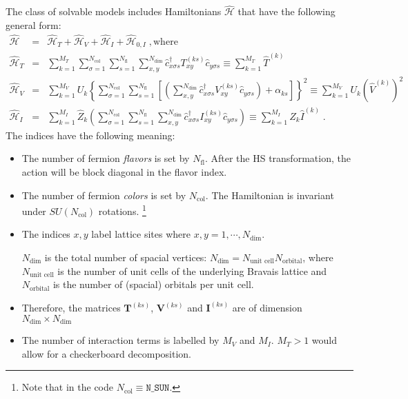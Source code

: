The class of solvable models includes  Hamiltonians $\hat{\mathcal{H}}$ that have the following general form:
\begin{eqnarray}
\hat{\mathcal{H}}&=&\hat{\mathcal{H}}_{T}+\hat{\mathcal{H}}_{V} +  \hat{\mathcal{H}}_{I} +   \hat{\mathcal{H}}_{0,I}\;,\mathrm{where}
\label{eqn:general_ham}\\
\hat{\mathcal{H}}_{T}
&=&
\sum\limits_{k=1}^{M_T}
\sum\limits_{\sigma=1}^{N_{\mathrm{col}}}
\sum\limits_{s=1}^{N_{\mathrm{fl}}}
\sum\limits_{x,y}^{N_{\mathrm{dim}}}
\hat{c}^{\dagger}_{x \sigma   s}T_{xy}^{(k s)} \hat{c}^{\phantom\dagger}_{y \sigma s}  \equiv  \sum\limits_{k=1}^{M_T} \hat{T}^{(k)}
\label{eqn:general_ham_t}\\
\hat{\mathcal{H}}_{V}
&=&
\sum\limits_{k=1}^{M_V}U_{k}
\left\{
\sum\limits_{\sigma=1}^{N_{\mathrm{col}}}
\sum\limits_{s=1}^{N_{\mathrm{fl}}}
\left[
\left(
\sum\limits_{x,y}^{N_{\mathrm{dim}}}
\hat{c}^{\dagger}_{x \sigma s}V_{xy}^{(k s)}\hat{c}^{\phantom\dagger}_{y \sigma s}
\right)
+\alpha_{k s} 
\right]
\right\}^{2}  \equiv   
\sum\limits_{k=1}^{M_V}U_{k}   \left(\hat{V}^{(k)} \right)^2
\label{eqn:general_ham_v}\\
\hat{\mathcal{H}}_{I}  & = &
\sum\limits_{k=1}^{M_I} \hat{Z}_{k} 
\left(
\sum\limits_{\sigma=1}^{N_{\mathrm{col}}}
\sum\limits_{s=1}^{N_{\mathrm{fl}}}
\sum\limits_{x,y}^{N_{\mathrm{dim}}}
\hat{c}^{\dagger}_{x \sigma s} I_{xy}^{(k s)}\hat{c}^{\phantom\dagger}_{y \sigma s}
\right) \equiv \sum\limits_{k=1}^{M_I} \hat{Z}_{k}    \hat{I}^{(k)} 
\;.\label{eqn:general_ham_i}
\end{eqnarray}
The indices have the following meaning:
\begin{itemize}
\item The number of fermion \textit{flavors} is set by $N_{\mathrm{fl}}$.  After the HS transformation, the action will be block diagonal in the flavor index. 
\item The number of fermion \textit{colors} is set by $N_{\mathrm{col}}$.    The Hamiltonian is invariant under  $SU(N_{\mathrm{col}})$  rotations. \footnote{Note that  in the code $ N_{\mathrm{col}} \equiv \texttt{N\_{SUN}} $.} 
\item The indices $x,y$ label lattice sites where $x,y=1,\cdots, N_{\mathrm{dim}}$. 

$N_{\mathrm{dim}}$ is the total number of spacial vertices: $N_{\mathrm{dim}}=N_{\text{unit cell}} N_{\mathrm{orbital}}$, 
where $N_{\text{unit cell}}$ is the number of unit cells of the underlying Bravais lattice and $N_{\mathrm{orbital}}$ is the number of (spacial) orbitals per unit cell.
\item Therefore, the  matrices $\bm{T}^{(k s)}$, $\bm{V}^{(ks)}$  and $\bm{I}^{(ks)}$ are  of dimension $N_{\mathrm{dim}}\times N_{\mathrm{dim}}$
\item The number of interaction terms  is labelled by $M_V$   and $M_I$.   $M_T> 1 $ would allow for a checkerboard decomposition.
\end{itemize}
